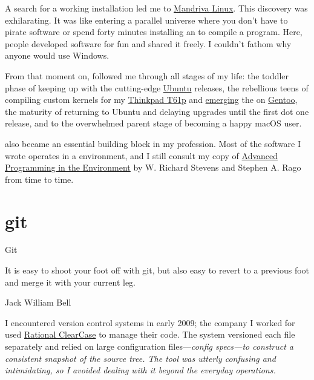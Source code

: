 \documentclass{article}
\begin{document}
A search for a working  installation led me to \href{https://en.wikipedia.org/wiki/Mandriva_Linux}{Mandriva Linux}.
This discovery was exhilarating.
It was like entering a parallel universe where you don't have to pirate software or spend forty minutes installing an  to compile a  program.
Here, people developed software for fun and shared it freely.
I couldn't fathom why anyone would use Windows.

From that moment on,  followed me through all stages of my life:
the toddler phase of keeping up with the cutting-edge \href{https://ubuntu.com}{Ubuntu} releases,
the rebellious teens of compiling custom kernels for my \href{https://www.thinkwiki.org/wiki/Category:T61p}{Thinkpad T61p} and \href{https://wiki.gentoo.org/wiki/Emerge}{emerging} the \href{https://wiki.gentoo.org/wiki/World_set_(Portage)}{} on \href{https://www.gentoo.org/}{Gentoo},
the maturity of returning to Ubuntu  and delaying upgrades until the first dot one release,
and to the overwhelmed parent stage of becoming a happy macOS user.

 also became an essential building block in my profession.
Most of the software I wrote operates in a  environment, and I still consult my copy of \href{https://www.goodreads.com/book/show/603263.Advanced_Programming_in_the_UNIX_Environment}{Advanced Programming in the  Environment} by W. Richard Stevens and Stephen A. Rago from time to time.

\section{git}{Git}

\epigraph{
  It is easy to shoot your foot off with git, but also easy to revert to a previous foot and merge it with your current leg.
}{
  Jack William Bell
}

I encountered version control systems in early 2009; the company I worked for used \href{https://en.wikipedia.org/wiki/IBM_Rational_ClearCase}{Rational ClearCase} to manage their code.
The system versioned each file separately and relied on large configuration files---\em{config specs}---to construct a consistent snapshot of the source tree.
The tool was utterly confusing and intimidating, so I avoided dealing with it beyond the everyday operations.
\end{document}
